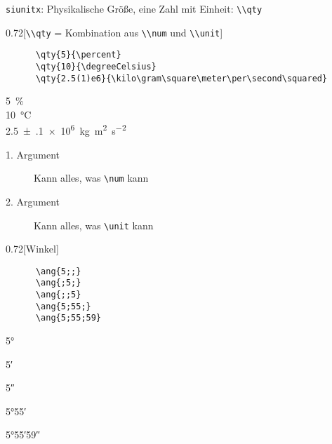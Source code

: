 \begin{frame}[fragile]{\texttt{siunitx}: Physikalische Größe, eine Zahl mit Einheit: \lstinline+\\qty+}
  \begin{CodeExample}{0.72}[\lstinline+\\qty+ {=} Kombination aus \lstinline+\\num+ und \lstinline+\\unit+]
    \begin{lstlisting}
      \qty{5}{\percent}
      \qty{10}{\degreeCelsius}
      \qty{2.5(1)e6}{\kilo\gram\square\meter\per\second\squared}
    \end{lstlisting}
  \CodeResult
    \strut
    \qty{5}{\percent} \\
    \qty{10}{\degreeCelsius} \\
    \qty{2.5(1)e6}{\kilo\gram\square\meter\per\second\squared}
  \end{CodeExample}
  \begin{description}
    \item[1. Argument] Kann alles, was \lstinline+\num+ kann
    \item[2. Argument] Kann alles, was \lstinline+\unit+ kann
  \end{description}
  \begin{CodeExample}{0.72}[Winkel]
    \begin{lstlisting}
      \ang{5;;}
      \ang{;5;}
      \ang{;;5}
      \ang{5;55;}
      \ang{5;55;59}
    \end{lstlisting}
  \CodeResult
    \strut\ang{5;;}\\
    \strut\ang{;5;}\\
    \strut\ang{;;5}\\
    \strut\ang{5;55;}\\
    \strut\ang{5;55;59}\\
  \end{CodeExample}
\end{frame}
